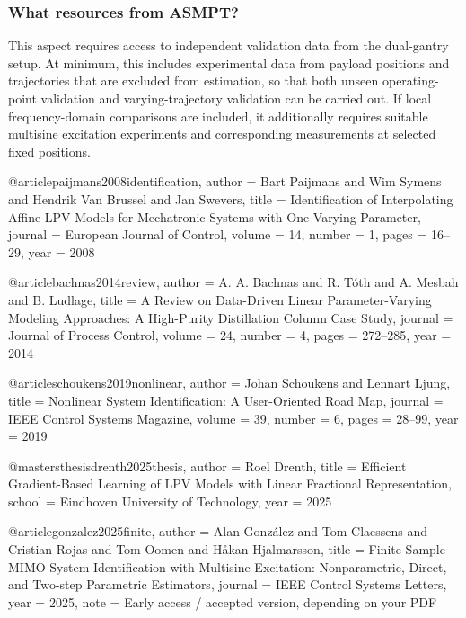 \subsubsection{What resources from ASMPT?}

This aspect requires access to independent validation data from the dual-gantry setup. At minimum, this includes experimental data from payload positions and trajectories that are excluded from estimation, so that both unseen operating-point validation and varying-trajectory validation can be carried out. If local frequency-domain comparisons are included, it additionally requires suitable multisine excitation experiments and corresponding measurements at selected fixed positions.



@article{paijmans2008identification,
  author  = {Bart Paijmans and Wim Symens and Hendrik Van Brussel and Jan Swevers},
  title   = {Identification of Interpolating Affine LPV Models for Mechatronic Systems with One Varying Parameter},
  journal = {European Journal of Control},
  volume  = {14},
  number  = {1},
  pages   = {16--29},
  year    = {2008}
}

@article{bachnas2014review,
  author  = {A. A. Bachnas and R. T{\'o}th and A. Mesbah and B. Ludlage},
  title   = {A Review on Data-Driven Linear Parameter-Varying Modeling Approaches: A High-Purity Distillation Column Case Study},
  journal = {Journal of Process Control},
  volume  = {24},
  number  = {4},
  pages   = {272--285},
  year    = {2014}
}

@article{schoukens2019nonlinear,
  author  = {Johan Schoukens and Lennart Ljung},
  title   = {Nonlinear System Identification: A User-Oriented Road Map},
  journal = {IEEE Control Systems Magazine},
  volume  = {39},
  number  = {6},
  pages   = {28--99},
  year    = {2019}
}

@mastersthesis{drenth2025thesis,
  author = {Roel Drenth},
  title  = {Efficient Gradient-Based Learning of LPV Models with Linear Fractional Representation},
  school = {Eindhoven University of Technology},
  year   = {2025}
}

@article{gonzalez2025finite,
  author  = {Alan Gonz{\'a}lez and Tom Claessens and Cristian Rojas and Tom Oomen and H{\aa}kan Hjalmarsson},
  title   = {Finite Sample MIMO System Identification with Multisine Excitation: Nonparametric, Direct, and Two-step Parametric Estimators},
  journal = {IEEE Control Systems Letters},
  year    = {2025},
  note    = {Early access / accepted version, depending on your PDF}
}